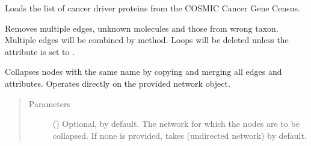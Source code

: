 \documentclass[letterpaper,10pt,english]{sphinxmanual}
\begin{document}
\begin{fulllineitems}
\begin{fulllineitems}
\begin{quote}
\begin{description}
\end{description}\end{quote}

\end{fulllineitems}


\begin{fulllineitems}
\label{\detokenize{main:pypath.main.PyPath.cancer_gene_census_list}}
Loads the list of cancer driver proteins from the COSMIC Cancer
Gene Census.

\end{fulllineitems}


\begin{fulllineitems}
\label{\detokenize{main:pypath.main.PyPath.clean_graph}}
Removes multiple edges, unknown molecules and those from wrong
taxon. Multiple edges will be combined by
{\hyperref[\detokenize{main:pypath.main.PyPath.combine_attr}]{}} method.
Loops will be deleted unless the attribute
 is set to .

\end{fulllineitems}


\begin{fulllineitems}
\label{\detokenize{main:pypath.main.PyPath.collapse_by_name}}
Collapses nodes with the same name by copying and merging
all edges and attributes. Operates directly on the provided
network object.
\begin{quote}\begin{description}
\item[{Parameters}] \leavevmode
{} () \textendash{} Optional,  by default. The network for which the
nodes are to be collapsed. If none is provided, takes
 (undirected network) by
default.


\end{description}
\end{quote}
\end{fulllineitems}
\end{fulllineitems}
\end{document}
